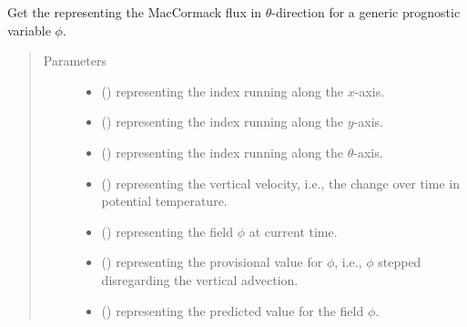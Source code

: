 \documentclass[letterpaper,10pt,english]{sphinxmanual}
\begin{document}
\begin{fulllineitems}

\begin{fulllineitems}
\label{\detokenize{api:tasmania.dycore.flux_isentropic_maccormack.FluxIsentropicMacCormack._get_maccormack_flux_z}}
Get the  representing the MacCormack flux in \(\theta\)-direction for a
generic prognostic variable \(\phi\).
\begin{quote}\begin{description}
\item[{Parameters}] \leavevmode\begin{itemize}
\item {} 
 () \textendash{}  representing the index running along the \(x\)-axis.

\item {} 
 () \textendash{}  representing the index running along the \(y\)-axis.

\item {} 
 () \textendash{}  representing the index running along the \(\theta\)-axis.

\item {} 
 () \textendash{}  representing the vertical velocity,
i.e., the change over time in potential temperature.

\item {} 
 () \textendash{}  representing the field \(\phi\) at current time.

\item {} 
 () \textendash{}  representing the provisional value for \(\phi\),
i.e., \(\phi\) stepped disregarding the vertical advection.

\item {} 
 () \textendash{}  representing the predicted value for the field \(\phi\).


\end{itemize}
\end{description}
\end{quote}
\end{fulllineitems}
\end{fulllineitems}
\end{document}
